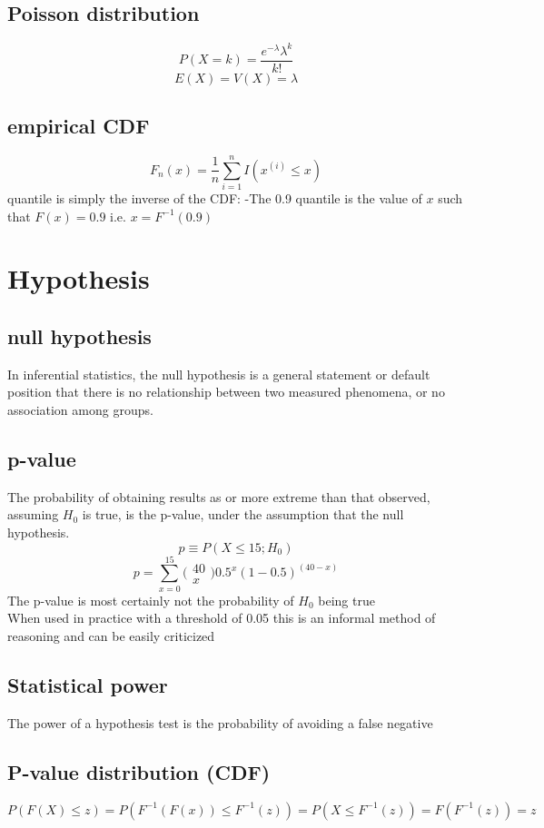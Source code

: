 \documentclass[12pt,a4paper]{article}
\begin{document}
\subsection{Poisson distribution}
$$
P(X=k) = \frac{e^{-\lambda}\lambda^k}{k!}
$$
$$
E(X)=V(X)=\lambda
$$

\subsection{empirical CDF}
$$
F_n(x)=\frac{1}{n}\sum_{i=1}^{n}I(x^{(i)}\leq x)
$$
quantile is simply the inverse of the CDF:
	-The 0.9 quantile is the value of $x$ such that $F(x)=0.9$ i.e. $x=F^{-1}(0.9)$
\section{Hypothesis}
\subsection*{null hypothesis}
In inferential statistics, the null hypothesis is a general statement or default position that there is no relationship between two measured phenomena, or no association among groups.
\subsection*{p-value}
The probability of obtaining results as or more extreme than that observed, assuming $H_0$ is true, is the p-value, under the assumption that the null hypothesis.
$$
p\equiv P(X\leq 15;H_0)
$$
$$
p=\sum_{x=0}^{15}\bigl(\begin{smallmatrix}40\\x\end{smallmatrix}\bigr)0.5^x(1-0.5)^{(40-x)}
$$
The p-value is most certainly not the probability of $H_0$ being true \\
When used in practice with a threshold of 0.05 this is an informal
method of reasoning and can be easily criticized\\
\subsection*{Statistical power}
The power of a hypothesis test is the probability of avoiding a false
negative
\subsection*{P-value distribution (CDF)}
$$
P(F(X)\leq z) = P(F^{-1}(F(x))\leq F^{-1}(z)) = P(X\leq F^{-1}(z))=F(F^{-1}(z))=z
$$
\end{document}
